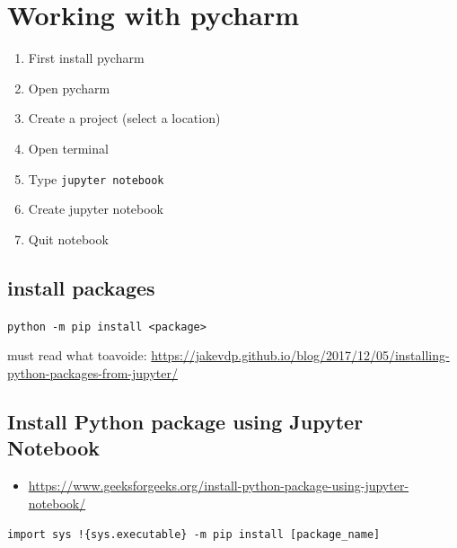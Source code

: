 \documentclass[
]{book}
\providecommand{\tightlist}{%
  \setlength{\itemsep}{0pt}\setlength{\parskip}{0pt}}
\begin{document}
\hypertarget{working-with-pycharm}{%
\chapter{Working with pycharm}\label{working-with-pycharm}}

\begin{enumerate}
\def\labelenumi{\arabic{enumi}.}
\tightlist
\item
  First install pycharm
\item
  Open pycharm
\item
  Create a project (select a location)
\item
  Open terminal
\item
  Type \texttt{jupyter\ notebook}
\item
  Create jupyter notebook
\item
  Quit notebook
\end{enumerate}

\hypertarget{install-packages}{%
\section{install packages}\label{install-packages}}

\texttt{python\ -m\ pip\ install\ \textless{}package\textgreater{}}

must read what toavoide: \url{https://jakevdp.github.io/blog/2017/12/05/installing-python-packages-from-jupyter/}

\hypertarget{install-python-package-using-jupyter-notebook}{%
\section{Install Python package using Jupyter Notebook}\label{install-python-package-using-jupyter-notebook}}

\begin{itemize}
\tightlist
\item
  \url{https://www.geeksforgeeks.org/install-python-package-using-jupyter-notebook/}
\end{itemize}

\texttt{import\ sys\ !\{sys.executable\}\ -m\ pip\ install\ {[}package\_name{]}}

  
\end{document}
